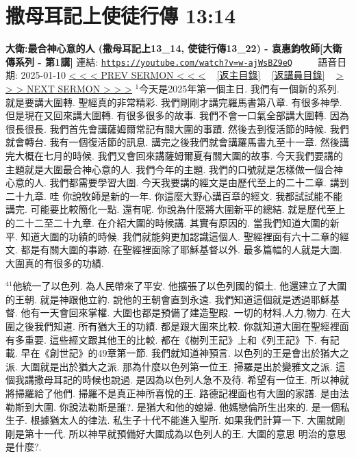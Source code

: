 \documentclass{book}
\begin{document}
\section{撒母耳記上使徒行傳 13:14}
\label{sec:w_ajWsBZ9eQ}
\textbf{大衛:最合神心意的人 (撒母耳記上13\_14, 使徒行傳13\_22) - 袁惠鈞牧師[大衛傳系列 - 第1講]}
\newline
\newline
連結: \href{https://youtube.com/watch?v=w-ajWsBZ9eQ}{\texttt{https://youtube.com/watch?v=w-ajWsBZ9eQ}} ~~~~ 語音日期: 2025-01-10
\newline
\newline
\hyperref[sec:9ORA5941xxk]{< < < PREV SERMON < < <}
~
\hyperlink{toc}{[返主目錄]}
~
\hyperref[ch:preacher12]{[返講員目錄]}
~
\hyperref[sec:pVOG1onrqjE]{> > > NEXT SERMON > > >}
\newline
\newline
$^{1}$今天是2025年第一個主日.
我們有一個新的系列.
就是要講大圍轉.
聖經真的非常精彩.
我們剛剛才講完羅馬書第八章.
有很多神學.
但是現在又回來講大圍轉.
有很多很多的故事.
我們不會一口氣全部講大圍轉.
因為很長很長.
我們首先會講薩姆爾常記有關大圍的事蹟.
然後去到復活節的時候.
我們就會轉台.
我有一個復活節的訊息.
講完之後我們就會講羅馬書九至十一章.
然後講完大概在七月的時候.
我們又會回來講薩姆爾夏有關大圍的故事.
今天我們要講的主題就是大圍最合神心意的人.
我們今年的主題.
我們的口號就是怎樣做一個合神心意的人.
我們都需要學習大圍.
今天我要講的經文是由歷代至上的二十二章.
講到二十九章.
哇 你說牧師是新的一年.
你這麼大野心講百章的經文.
我都試試能不能講完.
可能要比較簡化一點.
還有呢.
你說為什麼將大圍新平的總結.
就是歷代至上的二十二至二十九章.
在介紹大圍的時候講.
其實有原因的.
當我們知道大圍的新平.
知道大圍的功績的時候.
我們就能夠更加認識這個人.
聖經裡面有六十二章的經文.
都是有關大圍的事跡.
在聖經裡面除了耶穌基督以外.
最多篇幅的人就是大圍.
大圍真的有很多的功績.

$^{41}$他統一了以色列.
為人民帶來了平安.
他擴張了以色列國的領土.
他還建立了大圍的王朝.
就是神跟他立約.
說他的王朝會直到永遠.
我們知道這個就是透過耶穌基督.
他有一天會回來掌權.
大圍也都是預備了建造聖殿.
一切的材料,人力,物力.
在大圍之後我們知道.
所有猶大王的功績.
都是跟大圍來比較.
你就知道大圍在聖經裡面有多重要.
這些經文跟其他王的比較.
都在《樹列王記》上和《列王記》下.
有記載.
早在《創世記》的49章第一節.
我們就知道神預言.
以色列的王是會出於猶大之派.
大圍就是出於猶大之派.
那為什麼以色列第一位王.
掃羅是出於變雅文之派.
這個我講撒母耳記的時候也說過.
是因為以色列人急不及待.
希望有一位王.
所以神就將掃羅給了他們.
掃羅不是真正神所喜悅的王.
路德記裡面也有大圍的家譜.
是由法勒斯到大圍.
你說法勒斯是誰?.
是猶大和他的媳婦.
他媽戀倫所生出來的.
是一個私生子.
根據猶太人的律法.
私生子十代不能進入聖所.
如果我們計算一下.
大圍就剛剛是第十一代.
所以神早就預備好大圍成為以色列人的王.
大圍的意思 明治的意思是什麼?.
\end{document}
